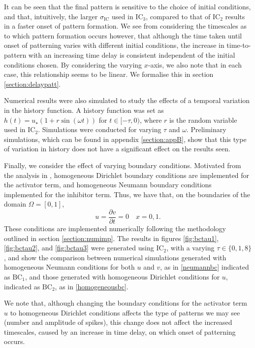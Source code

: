 It can be seen that the final pattern is sensitive to the choice of initial conditions, and that, intuitively, the larger $\sigma_{\text{IC}}$ used in $\text{IC}_3$, compared to that of $\text{IC}_2$ results in a faster onset of pattern formation. We see from considering the timescales as to which pattern formation occurs however, that although the time taken until onset of patterning varies with different initial conditions, the increase in time-to-pattern with an increasing time delay is consistent independent of the initial conditions chosen. By considering the varying $x$-axis, we also note that in each case, this relationship seems to be linear. We formalise this in section \ref{section:delaypatt}.

Numerical results were also simulated to study the effects of a temporal variation in the history function. A history function was set as $h(t)=u_\star(1+r\sin(\omega t))$ for $t\in[-\tau,0)$, where $r$ is the random variable used in $\text{IC}_2$. Simulations were conducted for varying $\tau$ and $\omega$. Preliminary simulations, which can be found in appendix \ref{section:appB}, show that this type of variation in history does not have a significant effect on the results seen.

Finally, we consider the effect of varying boundary conditions. Motivated from the analysis in \cite{krausemixed}, homogeneous Dirichlet boundary conditions are implemented for the activator term, and homogeneous Neumann boundary conditions implemented for the inhibitor term. Thus, we have that, on the boundaries of the domain $\Omega=[0,1]$,
\begin{equation}\label{homogeneousbc}
u=\frac{\partial v}{\partial t}=0 \quad x=0, 1.
\end{equation}
These conditions are implemented numerically following the methodology outlined in section \ref{section:numimp}. The results in figures \ref{fig:bctau1}, \ref{fig:bctau2}, and \ref{fig:bctau3} were generated using $\text{IC}_2$, with a varying $\tau\in\{0,1,8\}$, and show the comparison between numerical simulations generated with homogeneous Neumann conditions for both $u$ and $v$, as in \eqref{neumannbc} indicated as $\text{BC}_1$, and those generated with homogeneous Dirichlet conditions for $u$, indicated as $\text{BC}_2$, as in \eqref{homogeneousbc}.

We note that, although changing the boundary conditions for the activator term $u$ to homogeneous Dirichlet conditions affects the type of patterns we may see (number and amplitude of spikes), this change does not affect the increased timescales, caused by an increase in time delay, on which onset of patterning occurs.

